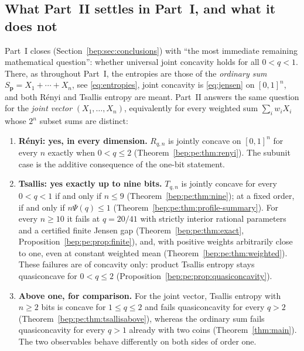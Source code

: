 \documentclass[11pt]{article}
\numberwithin{equation}{section}
\theoremstyle{definition}
\theoremstyle{remark}
\begin{document}
\subsection{What Part~II settles in Part~I, and what it does not}
\label{bep:pe:sec:settles}
Part~I closes (Section~\ref{bep:sec:conclusions}) with ``the most
immediate remaining mathematical question'': whether universal joint
concavity holds for all $0<q<1$. There, as throughout Part~I, the
entropies are those of the \emph{ordinary sum}
$S_{\boldsymbol p}=X_1+\cdots+X_n$, see \eqref{eq:entropies}, joint
concavity is \eqref{eq:jensen} on $[0,1]^n$, and both R\'enyi and Tsallis
entropy are meant. Part~II answers the same question for the \emph{joint
vector} $(X_1,\ldots,X_n)$, equivalently for every weighted sum
$\sum_iw_iX_i$ whose $2^n$ subset sums are distinct:
\begin{enumerate}[label=\textnormal{(\roman*)}]
\item \textbf{R\'enyi: yes, in every dimension.} $R_{q,n}$ is jointly
concave on $[0,1]^n$ for every $n$ exactly when $0<q\leq2$
(Theorem~\ref{bep:pe:thm:renyi}). The subunit case is the additive
consequence of the one-bit statement.
\item \textbf{Tsallis: yes exactly up to nine bits.} $T_{q,n}$ is jointly
concave for every $0<q<1$ if and only if $n\leq9$
(Theorem~\ref{bep:pe:thm:nine}); at a fixed order, if and only if
$n\Psi(q)\leq1$ (Theorem~\ref{bep:pe:thm:profile-summary}). For every
$n\geq10$ it fails at $q=20/41$ with strictly interior rational parameters
and a certified finite Jensen gap (Theorem~\ref{bep:pe:thm:exact},
Proposition~\ref{bep:pe:prop:finite}), and, with positive weights
arbitrarily close to one, even at constant weighted mean
(Theorem~\ref{bep:pe:thm:weighted}). These failures are of concavity only:
product Tsallis entropy stays quasiconcave for $0<q\leq2$
(Proposition~\ref{bep:pe:prop:quasiconcavity}).
\item \textbf{Above one, for comparison.} For the joint vector, Tsallis
entropy with $n\geq2$ bits is concave for $1\leq q\leq2$ and fails
quasiconcavity for every $q>2$ (Theorem~\ref{bep:pe:thm:tsallisabove}),
whereas the ordinary sum fails quasiconcavity for every $q>1$ already with
two coins (Theorem~\ref{thm:main}). The two observables behave differently
on both sides of order one.
\end{enumerate}
\end{document}
